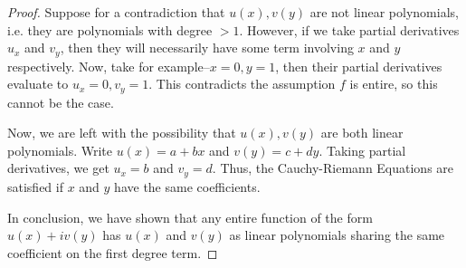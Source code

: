 \documentclass[11pt]{article}
\begin{document}
\begin{enumerate}
\begin{proof}
		\bigskip
		
		Suppose for a contradiction that $u(x), v(y)$ are not linear polynomials, i.e. they are polynomials with degree $> 1$. However, if we take partial derivatives $u_x$ and $v_y$, then they will necessarily have some term involving $x$ and $y$ respectively. Now, take for example--$x = 0, y = 1$, then their partial derivatives evaluate to $u_x= 0, v_y= 1$. This contradicts the assumption $f$ is entire, so this cannot be the case.
		
		\bigskip
		
		Now, we are left with the possibility that $u(x), v(y)$ are both linear polynomials. Write $u(x) = a + bx$ and $v(y) = c + dy$. Taking partial derivatives, we get $u_x = b$ and $v_y = d$. Thus, the Cauchy-Riemann Equations are satisfied if $x$ and $y$ have the same coefficients.
		
		\bigskip
		
		In conclusion, we have shown that any entire function of the form $u(x) + iv(y)$ has $u(x)$ and $v(y)$ as linear polynomials sharing the same coefficient on the first degree term.
	\end{proof}
\end{enumerate}
\end{document}

